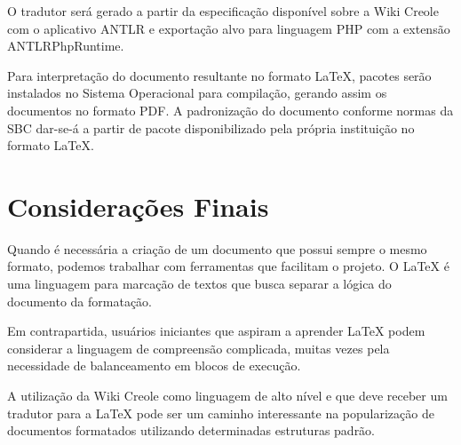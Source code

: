 \documentclass{article}
\begin{document}
O tradutor será gerado a partir da especificação disponível sobre a Wiki Creole
com o aplicativo ANTLR e exportação alvo para linguagem PHP com a extensão
ANTLRPhpRuntime.

Para interpretação do documento resultante no formato \LaTeX{}, pacotes serão
instalados no Sistema Operacional para compilação, gerando assim os documentos
no formato PDF. A padronização do documento conforme normas da SBC dar-se-á a
partir de pacote disponibilizado pela própria instituição no formato \LaTeX{}.

\section{Considerações Finais}
\label{sec:consideracoes}

Quando é necessária a criação de um documento que possui sempre o mesmo formato,
podemos trabalhar com ferramentas que facilitam o projeto. O \LaTeX{} é uma
linguagem para marcação de textos que busca separar a lógica do documento da
formatação.

Em contrapartida, usuários iniciantes que aspiram a aprender \LaTeX{} podem
considerar a linguagem de compreensão complicada, muitas vezes pela necessidade
de balanceamento em blocos de execução.

A utilização da Wiki Creole como linguagem de alto nível e que deve receber um
tradutor para a \LaTeX{} pode ser um caminho interessante na popularização de
documentos formatados utilizando determinadas estruturas padrão.



\end{document}

